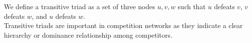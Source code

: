 \documentclass[preview]{standalone}
\begin{document}
We define a transitive triad as a set of three nodes $u, v, w$ such that $u$ defeats $v$, $v$ defeats $w$, and $u$ defeats $w$.\\Transitive triads are important in competition networks as they indicate a clear hierarchy or dominance relationship among competitors.\\
\end{document}
